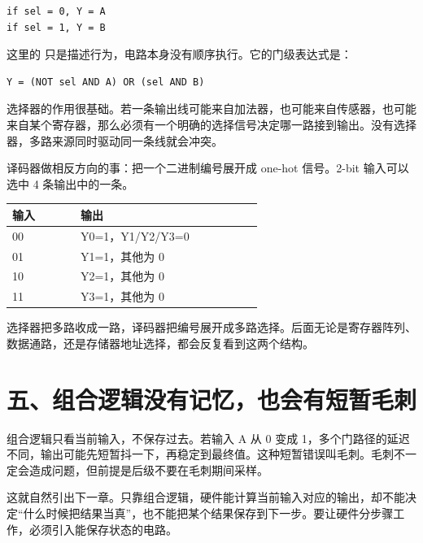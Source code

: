 \begin{lstlisting}
if sel = 0, Y = A
if sel = 1, Y = B
\end{lstlisting}

这里的  只是描述行为，电路本身没有顺序执行。它的门级表达式是：

\begin{lstlisting}
Y = (NOT sel AND A) OR (sel AND B)
\end{lstlisting}

选择器的作用很基础。若一条输出线可能来自加法器，也可能来自传感器，也可能来自某个寄存器，那么必须有一个明确的选择信号决定哪一路接到输出。没有选择器，多路来源同时驱动同一条线就会冲突。

译码器做相反方向的事：把一个二进制编号展开成 one-hot 信号。2-bit 输入可以选中 4 条输出中的一条。

\begin{longtable}{p{0.18\linewidth}p{0.48\linewidth}}
\toprule
输入 & 输出 \\
\midrule
00 & Y0=1，Y1/Y2/Y3=0 \\
01 & Y1=1，其他为 0 \\
10 & Y2=1，其他为 0 \\
11 & Y3=1，其他为 0 \\
\bottomrule
\end{longtable}

选择器把多路收成一路，译码器把编号展开成多路选择。后面无论是寄存器阵列、数据通路，还是存储器地址选择，都会反复看到这两个结构。

\section{五、组合逻辑没有记忆，也会有短暂毛刺}

组合逻辑只看当前输入，不保存过去。若输入 A 从 0 变成 1，多个门路径的延迟不同，输出可能先短暂抖一下，再稳定到最终值。这种短暂错误叫毛刺。毛刺不一定会造成问题，但前提是后级不要在毛刺期间采样。

这就自然引出下一章。只靠组合逻辑，硬件能计算当前输入对应的输出，却不能决定“什么时候把结果当真”，也不能把某个结果保存到下一步。要让硬件分步骤工作，必须引入能保存状态的电路。

